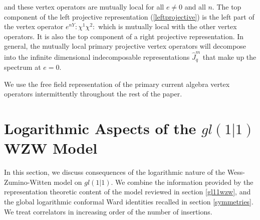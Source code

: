 \documentclass[12pt]{article}
\numberwithin{equation}{section}
\numberwithin{equation}{section}
\numberwithin{table}{section}\setlength{\multlinegap}{25pt}
\begin{document}
and these vertex operators are mutually local for all $e \neq 0$ and all $n$.
 The top component of the left projective representation (\ref{leftprojective})
 is the left part of the vertex
operator $e^{n Y} : \chi^1 \chi^2:$ which is mutually local with the other vertex operators. It is also the top component of a right projective representation.
 In general,  the mutually local primary projective vertex operators
will decompose into the infinite dimensional indecomposable representations $\hat{J}^m_q$ that make up the spectrum at $e=0$.

We use the free field representation of the primary current algebra vertex operators intermittently throughout the rest of the paper.











\section{Logarithmic Aspects of the $gl(1|1)$ WZW Model}
\label{log}
In this section, we discuss consequences of the logarithmic nature of the Wess-Zumino-Witten model
on $gl(1|1)$. We combine the information provided by the representation theoretic content of the model reviewed in section \ref{gl11wzw},
and the global logarithmic conformal Ward identities recalled in section \ref{symmetries}. We treat correlators in increasing order of the number
of insertions.
\end{document}
